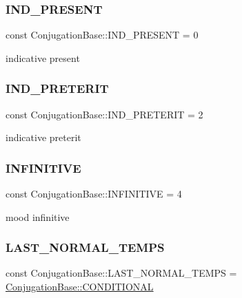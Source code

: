 \subsubsection{\texorpdfstring{I\+N\+D\+\_\+\+P\+R\+E\+S\+E\+NT}{IND\_PRESENT}}
{\footnotesize\ttfamily const Conjugation\+Base\+::\+I\+N\+D\+\_\+\+P\+R\+E\+S\+E\+NT = 0}

indicative present \hypertarget{classConjugationBase_a479f338d318e0c399b20e66ecd7a03ad}{}\label{classConjugationBase_a479f338d318e0c399b20e66ecd7a03ad} 
\subsubsection{\texorpdfstring{I\+N\+D\+\_\+\+P\+R\+E\+T\+E\+R\+IT}{IND\_PRETERIT}}
{\footnotesize\ttfamily const Conjugation\+Base\+::\+I\+N\+D\+\_\+\+P\+R\+E\+T\+E\+R\+IT = 2}

indicative preterit \hypertarget{classConjugationBase_abfe86b2588be8dc7fc44f29a4dae0641}{}\label{classConjugationBase_abfe86b2588be8dc7fc44f29a4dae0641} 
\subsubsection{\texorpdfstring{I\+N\+F\+I\+N\+I\+T\+I\+VE}{INFINITIVE}}
{\footnotesize\ttfamily const Conjugation\+Base\+::\+I\+N\+F\+I\+N\+I\+T\+I\+VE = 4}

mood infinitive \hypertarget{classConjugationBase_a611f1018ef9d7b1fb76ef25864bc09b9}{}\label{classConjugationBase_a611f1018ef9d7b1fb76ef25864bc09b9} 
\subsubsection{\texorpdfstring{L\+A\+S\+T\+\_\+\+N\+O\+R\+M\+A\+L\+\_\+\+T\+E\+M\+PS}{LAST\_NORMAL\_TEMPS}}
{\footnotesize\ttfamily const Conjugation\+Base\+::\+L\+A\+S\+T\+\_\+\+N\+O\+R\+M\+A\+L\+\_\+\+T\+E\+M\+PS = \hyperlink{classConjugationBase_aac0359d9a8bb66ea04612b7f14d43c50}{Conjugation\+Base\+::\+C\+O\+N\+D\+I\+T\+I\+O\+N\+AL}}

